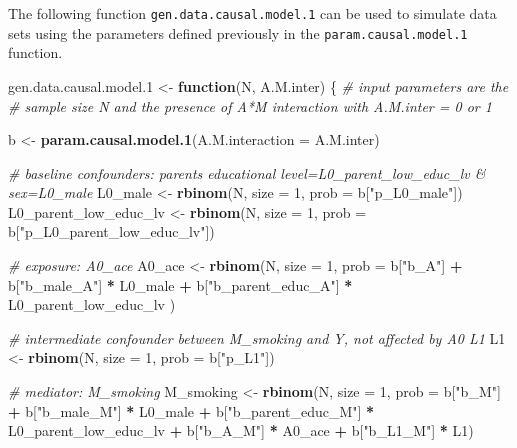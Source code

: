 \documentclass[
]{book}
\newenvironment{Shaded}{\begin{snugshade}}{\end{snugshade}}
\newcommand{\AttributeTok}[1]{\textcolor[rgb]{0.13,0.29,0.53}{#1}}
\newcommand{\CommentTok}[1]{\textcolor[rgb]{0.56,0.35,0.01}{\textit{#1}}}
\newcommand{\ControlFlowTok}[1]{\textcolor[rgb]{0.13,0.29,0.53}{\textbf{#1}}}
\newcommand{\DecValTok}[1]{\textcolor[rgb]{0.00,0.00,0.81}{#1}}
\newcommand{\FloatTok}[1]{\textcolor[rgb]{0.00,0.00,0.81}{#1}}
\newcommand{\FunctionTok}[1]{\textcolor[rgb]{0.13,0.29,0.53}{\textbf{#1}}}
\newcommand{\NormalTok}[1]{#1}
\newcommand{\OtherTok}[1]{\textcolor[rgb]{0.56,0.35,0.01}{#1}}
\newcommand{\SpecialCharTok}[1]{\textcolor[rgb]{0.81,0.36,0.00}{\textbf{#1}}}
\newcommand{\StringTok}[1]{\textcolor[rgb]{0.31,0.60,0.02}{#1}}
\begin{document}
The following function \texttt{gen.data.causal.model.1} can be used to simulate data sets using the parameters defined previously in the \texttt{param.causal.model.1} function.

\begin{Shaded}
\begin{Highlighting}[]
\NormalTok{gen.data.causal.model}\FloatTok{.1} \OtherTok{\textless{}{-}} \ControlFlowTok{function}\NormalTok{(N, A.M.inter) \{ }\CommentTok{\# input parameters are the }
  \CommentTok{\#   sample size N and the presence of A*M interaction with A.M.inter = 0 or 1}
  
\NormalTok{  b }\OtherTok{\textless{}{-}} \FunctionTok{param.causal.model.1}\NormalTok{(}\AttributeTok{A.M.interaction =}\NormalTok{ A.M.inter)}
    
  \CommentTok{\# baseline confounders: parent\textquotesingle{}s educational level=L0\_parent\_low\_educ\_lv \& sex=L0\_male}
\NormalTok{  L0\_male }\OtherTok{\textless{}{-}} \FunctionTok{rbinom}\NormalTok{(N, }\AttributeTok{size =} \DecValTok{1}\NormalTok{, }\AttributeTok{prob =}\NormalTok{ b[}\StringTok{"p\_L0\_male"}\NormalTok{]) }
\NormalTok{  L0\_parent\_low\_educ\_lv }\OtherTok{\textless{}{-}} \FunctionTok{rbinom}\NormalTok{(N, }\AttributeTok{size =} \DecValTok{1}\NormalTok{, }\AttributeTok{prob =}\NormalTok{ b[}\StringTok{"p\_L0\_parent\_low\_educ\_lv"}\NormalTok{])  }
  
  \CommentTok{\# exposure: A0\_ace}
\NormalTok{  A0\_ace }\OtherTok{\textless{}{-}} \FunctionTok{rbinom}\NormalTok{(N, }\AttributeTok{size =} \DecValTok{1}\NormalTok{, }\AttributeTok{prob =}\NormalTok{  b[}\StringTok{"b\_A"}\NormalTok{] }\SpecialCharTok{+} 
\NormalTok{                     b[}\StringTok{"b\_male\_A"}\NormalTok{] }\SpecialCharTok{*}\NormalTok{ L0\_male }\SpecialCharTok{+} 
\NormalTok{                     b[}\StringTok{"b\_parent\_educ\_A"}\NormalTok{] }\SpecialCharTok{*}\NormalTok{ L0\_parent\_low\_educ\_lv ) }
  
  \CommentTok{\# intermediate confounder between M\_smoking and Y, not affected by A0 L1}
\NormalTok{  L1 }\OtherTok{\textless{}{-}} \FunctionTok{rbinom}\NormalTok{(N, }\AttributeTok{size =} \DecValTok{1}\NormalTok{, }\AttributeTok{prob =}\NormalTok{ b[}\StringTok{"p\_L1"}\NormalTok{])}
  
  \CommentTok{\# mediator: M\_smoking}
\NormalTok{  M\_smoking }\OtherTok{\textless{}{-}} \FunctionTok{rbinom}\NormalTok{(N, }\AttributeTok{size =} \DecValTok{1}\NormalTok{, }\AttributeTok{prob =}\NormalTok{ b[}\StringTok{"b\_M"}\NormalTok{] }\SpecialCharTok{+} 
\NormalTok{                        b[}\StringTok{"b\_male\_M"}\NormalTok{] }\SpecialCharTok{*}\NormalTok{ L0\_male }\SpecialCharTok{+} 
\NormalTok{                        b[}\StringTok{"b\_parent\_educ\_M"}\NormalTok{] }\SpecialCharTok{*}\NormalTok{ L0\_parent\_low\_educ\_lv }\SpecialCharTok{+} 
\NormalTok{                        b[}\StringTok{"b\_A\_M"}\NormalTok{] }\SpecialCharTok{*}\NormalTok{ A0\_ace }\SpecialCharTok{+}
\NormalTok{                        b[}\StringTok{"b\_L1\_M"}\NormalTok{] }\SpecialCharTok{*}\NormalTok{ L1) }


\end{Highlighting}
\end{Shaded}
\end{document}
